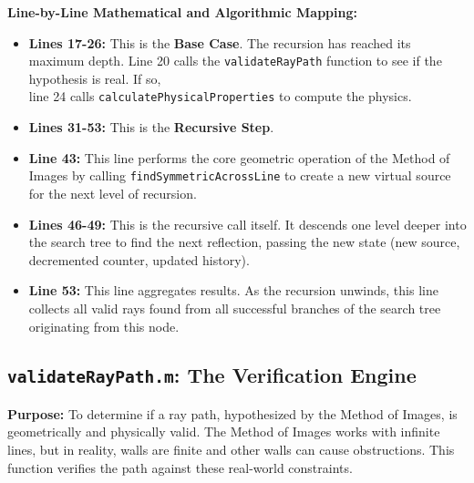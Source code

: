 \documentclass{article}
\begin{document}
	
	
	\textbf{Line-by-Line Mathematical and Algorithmic Mapping:}
	\begin{itemize}
		\item \textbf{Lines 17-26:} This is the \textbf{Base Case}. The recursion has reached its maximum depth. Line 20 calls the \texttt{validateRayPath} function to see if the hypothesis is real. If so,\\
		line 24 calls \texttt{calculatePhysicalProperties} to compute the physics.
		\item \textbf{Lines 31-53:} This is the \textbf{Recursive Step}.
		\item \textbf{Line 43:} This line performs the core geometric operation of the Method of Images by calling \texttt{findSymmetricAcrossLine} to create a new virtual source for the next level of recursion.
		\item \textbf{Lines 46-49:} This is the recursive call itself. It descends one level deeper into the search tree to find the next reflection, passing the new state (new source, decremented counter, updated history).
		\item \textbf{Line 53:} This line aggregates results. As the recursion unwinds, this line collects all valid rays found from all successful branches of the search tree originating from this node.
	\end{itemize}
	
	\subsection{\texttt{validateRayPath.m}: The Verification Engine}
	\textbf{Purpose:} To determine if a ray path, hypothesized by the Method of Images, is geometrically and physically valid. The Method of Images works with infinite lines, but in reality, walls are finite and other walls can cause obstructions. This function verifies the path against these real-world constraints.
	
\end{document}

